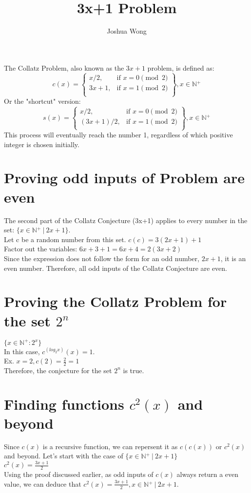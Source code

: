 \documentclass[a4paper,10pt]{article}
\title{3x+1 Problem}
\author{Joshua Wong}
\begin{document}
\maketitle
  The Collatz Problem, also known as the \(3x+1\) problem, is defined as:
  \[
    c(x) = \left.
    \begin{cases}
        x/2, & \text{if } x = 0 {\pmod {2}}\\
        3x+1, & \text{if } x = 1 {\pmod {2}} \\
        \end{cases}
    \right\}, x \in \mathbb{N{^+}}
  \]
  Or the "shortcut" version:
  \[
    s(x) = \left.
    \begin{cases}
        x/2, & \text{if } x = 0 {\pmod {2}}\\
        (3x+1)/2, & \text{if } x = 1 {\pmod {2}} \\
        \end{cases}
    \right\}, x \in \mathbb{N{^+}}
  \]
  This process will eventually reach the number 1, regardless of which positive integer is chosen initially.
  \section{Proving odd inputs of Problem are even}
  The second part of the Collatz Conjecture (3x+1) applies to every number in the set: \(\{ x \in \mathbb{N{^+}} \ | \ 2x+1 \}\). \\
  Let c be a random number from this set. \(c(c) = 3(2x+1)+1 \) \\
  Factor out the variables: \(6x+3+1 = 6x+4 = 2(3x+2)\) \\
  Since the expression does not follow the form for an odd number, \(2x+1\), it is an even number.
  Therefore, all odd inputs of the Collatz Conjecture are even.
  \section{Proving the Collatz Problem for the set $2^{n}$}
  \(\{x \in \mathbb{N{^+}}: 2{^x}\}\) \\
  In this case, \(c^{(log_2{x})}(x) = 1\). \\
  Ex. \(x = 2, c(2) = \frac{2}{2} = 1\) \\
  Therefore, the conjecture for the set $2^{n}$ is true.
  \section{Finding functions $c{^2}(x)$ and beyond}
  Since $c(x)$ is a recursive function, we can repersent it as $c(c(x))$ or $c{^2}(x)$ and beyond.
  Let's start with the case of \(\{x \in \mathbb{N{^+}} \ | \ 2x+1\}\) \\
  \(c^2(x) = \frac{3x+1}{2}\) \\
  Using the proof discussed earlier, as odd inputs of \(c(x)\) always return a even value, we can deduce that \(c^2(x) = \frac{3x+1}{2}, x \in \mathbb{N{^+}} \ | \ 2x+1\).

\end{document}
